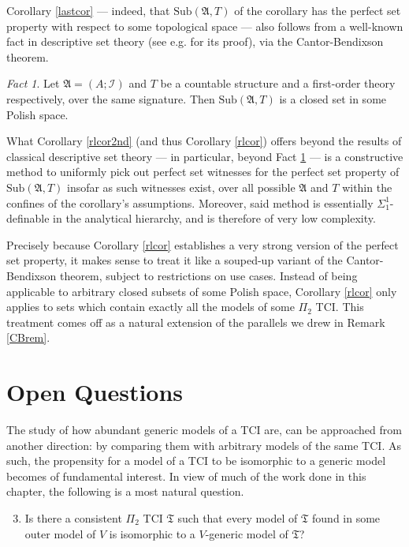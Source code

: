 \documentclass[12pt, twoside]{memoir}
\numberwithin{equation}{section}
\theoremstyle{definition}
\theoremstyle{remark}
\newtheorem{fact}[thm]{Fact}
\theoremstyle{definition}
\theoremstyle{definition}
\theoremstyle{definition}
\theoremstyle{remark}
\begin{document}
Corollary \ref{lastcor} --- indeed, that $\mathrm{Sub}(\mathfrak{A}, T)$ of the corollary has the perfect set property with respect to some topological space --- also follows from a well-known fact in descriptive set theory (see e.g. \cite{kechris} for its proof), via the Cantor-Bendixson theorem. 

\begin{fact}\label{lastfact}
Let $\mathfrak{A} = (A; \mathcal{I})$ and $T$ be a countable structure and a first-order theory respectively, over the same signature. Then $\mathrm{Sub}(\mathfrak{A}, T)$ is a closed set in some Polish space.
\end{fact}

What Corollary \ref{rlcor2nd} (and thus Corollary \ref{rlcor}) offers beyond the results of classical descriptive set theory --- in particular, beyond Fact \ref{lastfact} --- is a constructive method to uniformly pick out perfect set witnesses for the perfect set property of $\mathrm{Sub}(\mathfrak{A}, T)$ insofar as such witnesses exist, over all possible $\mathfrak{A}$ and $T$ within the confines of the corollary's assumptions. Moreover, said method is essentially $\Sigma^1_1$-definable in the analytical hierarchy, and is therefore of very low complexity.

Precisely because Corollary \ref{rlcor} establishes a very strong version of the perfect set property, it makes sense to treat it like a souped-up variant of the Cantor-Bendixson theorem, subject to restrictions on use cases. Instead of being applicable to arbitrary closed subsets of some Polish space, Corollary \ref{rlcor} only applies to sets which contain exactly all the models of some $\Pi_2$ TCI. This treatment comes off as a natural extension of the parallels we drew in Remark \ref{CBrem}.

\section{Open Questions}

The study of how abundant generic models of a TCI are, can be approached from another direction: by comparing them with arbitrary models of the same TCI. As such, the propensity for a model of a TCI to be isomorphic to a generic model becomes of fundamental interest. In view of much of the work done in this chapter, the following is a most natural question.

\begin{enumerate}[label=(Q\arabic*)]
    \setcounter{enumi}{2}
    \item\label{54qn2} Is there a consistent $\Pi_2$ TCI $\mathfrak{T}$ such that every model of $\mathfrak{T}$ found in some outer model of $V$ is isomorphic to a $V$-generic model of $\mathfrak{T}$?
\end{enumerate}
\end{document}
